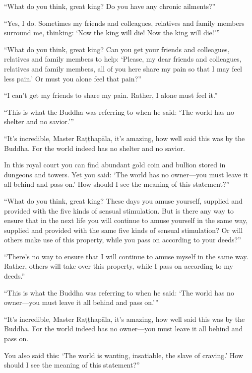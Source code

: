\documentclass[12pt,openany]{book}%
\begin{document}
“What do you think, great king? Do you have any chronic ailments?” 

“Yes, I do. Sometimes my friends and colleagues, relatives and family members surround me, thinking: ‘Now the king will die! Now the king will die!’” 

“What do you think, great king? Can you get your friends and colleagues, relatives and family members to help: ‘Please, my dear friends and colleagues, relatives and family members, all of you here share my pain so that I may feel less pain.’ Or must you alone feel that pain?” 

“I can’t get my friends to share my pain. Rather, I alone must feel it.” 

“This is what the Buddha was referring to when he said: ‘The world has no shelter and no savior.’” 

“It’s incredible, Master \textsanskrit{Raṭṭhapāla}, it’s amazing, how well said this was by the Buddha. For the world indeed has no shelter and no savior. 

In this royal court you can find abundant gold coin and bullion stored in dungeons and towers. Yet you said: ‘The world has no owner—you must leave it all behind and pass on.’ How should I see the meaning of this statement?” 

“What do you think, great king? These days you amuse yourself, supplied and provided with the five kinds of sensual stimulation. But is there any way to ensure that in the next life you will continue to amuse yourself in the same way, supplied and provided with the same five kinds of sensual stimulation? Or will others make use of this property, while you pass on according to your deeds?” 

“There’s no way to ensure that I will continue to amuse myself in the same way. Rather, others will take over this property, while I pass on according to my deeds.” 

“This is what the Buddha was referring to when he said: ‘The world has no owner—you must leave it all behind and pass on.’” 

“It’s incredible, Master \textsanskrit{Raṭṭhapāla}, it’s amazing, how well said this was by the Buddha. For the world indeed has no owner—you must leave it all behind and pass on. 

You also said this: ‘The world is wanting, insatiable, the slave of craving.’ How should I see the meaning of this statement?” 
\end{document}
